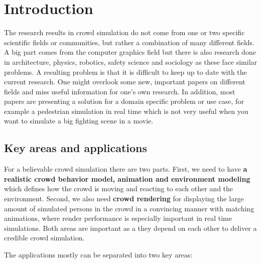 \documentclass{acmsiggraph}               %
\begin{document}
\keywordlist

\section{Introduction}


\copyrightspace


The research results in crowd simulation do not come from one or two specific scientific fields or communities, but rather a combination of many different fields. A big part comes from the computer graphics field but there is also research done in architecture, physics, robotics, safety science and sociology as these face similar problems. A resulting problem is that it is difficult to keep up to date with the current research. One might overlook some new, important papers on different fields and miss useful information for one's own research. In addition, most papers are presenting a solution for a domain specific problem or use case, for example a pedestrian simulation in real time \cite{karamouzas_predictive_2009} which is not very useful when you want to simulate a big fighting scene in a movie.

\subsection{Key areas and applications}
\label{chap:key_areas}
For a believable crowd simulation there are two parts. First, we need to have \textbf{a realistic crowd behavior model, animation and environment modeling} which defines how the crowd is moving and reacting to each other and the environment. Second, we also need \textbf{crowd rendering} for displaying the large amount of simulated persons in the crowd in a convincing manner with matching animations, where render performance is especially important in real time simulations. Both areas are important as a they depend on each other to deliver a credible crowd simulation.

The applications mostly can be separated into two key areas:
\end{document}
